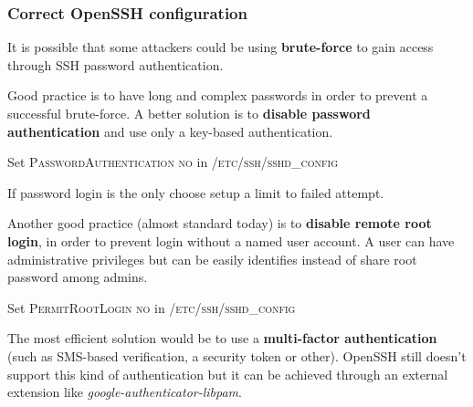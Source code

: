 \begin{frame}
	\frametitle{Correct OpenSSH configuration}
	
	It is possible that some attackers could be using \textbf{brute-force} to gain access through SSH password authentication.
	
	\medskip
	
	Good practice is to have long and complex passwords in order to prevent a successful brute-force.
	A better solution is to \textbf{disable password authentication} and use only a key-based authentication. 

  \smallskip
  	
	Set \textsc{PasswordAuthentication no} in \textsc{/etc/ssh/sshd\_config}
	
	\medskip

  If password	login is the only choose setup a limit to failed attempt.
  
	\medskip
	
	Another good practice (almost standard today) is to \textbf{disable remote root login}, in order to prevent login without a named user account. 
	A user can have administrative privileges but can be easily identifies instead of share root password among admins.

  \smallskip
  	
	Set \textsc{PermitRootLogin no} in \textsc{/etc/ssh/sshd\_config}
	
	\medskip

  The most efficient solution would be to use a \textbf{multi-factor authentication} (such as SMS-based verification, a security token or other). 
  OpenSSH still doesn't support this kind of authentication but it can be achieved through an external extension like \textit{google-authenticator-libpam}. 	
  
\end{frame}


